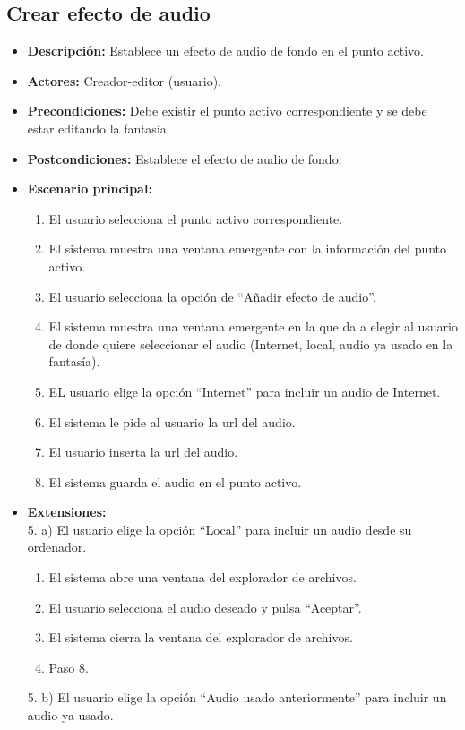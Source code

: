 \subsection{Crear efecto de audio}
\begin{itemize}
	\item \textbf{Descripción:} Establece un efecto de audio de fondo en el punto activo.
	\item \textbf{Actores:} Creador-editor (usuario).
	\item \textbf{Precondiciones:} Debe existir el punto activo correspondiente y se debe estar editando la fantasía.
	\item \textbf{Postcondiciones:} Establece el efecto de audio de fondo.
	\item \textbf{Escenario principal:}
	\begin{enumerate}
		\item El usuario selecciona el punto activo correspondiente.
		\item El sistema muestra una ventana emergente con la información del punto activo.
		\item El usuario selecciona la opción de ``Añadir efecto de audio''.
		\item El sistema muestra una ventana emergente en la que da a elegir al usuario de donde quiere seleccionar el audio (Internet, local, audio ya usado en la fantasía).
		\item EL usuario elige la opción ``Internet'' para incluir un audio de Internet.
		\item El sistema le pide al usuario la url del audio.
		\item El usuario inserta la url del audio.
		\item El sistema guarda el audio en el punto activo.
	\end{enumerate}
	\item \textbf{Extensiones:} \\ 5. a) El usuario elige la opción ``Local'' para incluir un audio desde su ordenador.
	\begin{enumerate}
		\item El sistema abre una ventana del explorador de archivos.
		\item El usuario selecciona el audio deseado y pulsa ``Aceptar''.
		\item El sistema cierra la ventana del explorador de archivos.
		\item Paso 8.
	\end{enumerate}
	5. b) El usuario elige la opción ``Audio usado anteriormente'' para incluir un audio ya usado.

\end{itemize}

